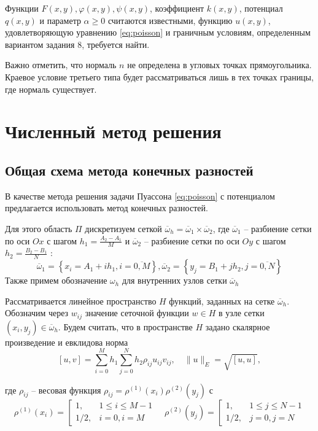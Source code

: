 \documentclass[12pt, fleqn]{article}
\theoremstyle{definition}
\begin{document}
Функции $F(x, y), \varphi(x, y), \psi(x, y)$, коэффициент $k(x, y)$, потенциал $q(x, y)$ и параметр $\alpha \geqslant 0$ считаются известными, функцию $u(x, y)$, удовлетворяющую уравнению \ref{eq:poisson} и граничным условиям, определенным вариантом задания 8, требуется найти.

Важно отметить, что нормаль $n$ не определена в угловых точках прямоугольника. Краевое условие третьего типа будет рассматриваться лишь в тех точках границы, где нормаль существует.
\section{Численный метод решения}\label{sec:numeric}
\subsection{Общая схема метода конечных разностей}
В качестве метода решения задачи Пуассона \ref{eq:poisson} с потенциалом предлагается использовать метод конечных разностей.

Для этого область $\Pi$ дискретизуем сеткой $\overline{\omega}_{h}=\overline{\omega}_{1} \times \overline{\omega}_{2}$, где $\overline{\omega}_{1}$ -- разбиение сетки по оси $Ox$ с шагом $h_{1}=\frac{A_{2}-A_{1}}{M}$ и $\overline{\omega}_{2}$ -- разбиение сетки по оси $Oy$ с шагом $ h_{2}=\frac{B_{2}-B_{1}}{N}$ :
\abovedisplayskip=1pt
\belowdisplayskip=2pt
\noindent
$$
\overline{\omega}_{1}=\left\{x_{i}=A_{1}+i h_{1}, i=\overline{0, M}\right\}, \overline{\omega}_{2}=\left\{y_{j}=B_{1}+j h_{2}, j=\overline{0, N}\right\}
$$
Также примем обозначение $\omega_{h}$ для внутренних узлов сетки $\overline{\omega}_{h}$

Рассматривается линейное пространство $H$ функций, заданных на сетке $\overline{\omega}_{h}$. Обозначим через $w_{ij}$ значение сеточной функции $w \in H$ в узле сетки $\left(x_{i}, y_{j}\right) \in \overline{\omega}_{h}$. Будем считать, что в пространстве $H$ задано скалярное произведение и евклидова норма
\abovedisplayskip=1pt
\belowdisplayskip=2pt
\noindent
$$
[u, v]=\sum_{i=0}^{M} h_{1} \sum_{j=0}^{N} h_{2} \rho_{i j} u_{i j} v_{i j}, \quad\|u\|_{E}=\sqrt{[u, u]},
$$

где $\rho_{i j}$ -- весовая функция $\rho_{i j}=\rho^{(1)}\left(x_{i}\right) \rho^{(2)}\left(y_{j}\right)$ с
\abovedisplayskip=1pt
\belowdisplayskip=2pt
\noindent
$$
\rho^{(1)}\left(x_{i}\right)=\left[\begin{array}{rl}
1, & 1 \leqslant i \leqslant M-1 \\
1 / 2, & i=0, i=M
\end{array} \quad \rho^{(2)}\left(y_{j}\right)=\left[\begin{array}{rl}
1, & 1 \leqslant j \leqslant N-1 \\
1 / 2, & j=0, j=N
\end{array}\right.\right.
$$
\end{document}
